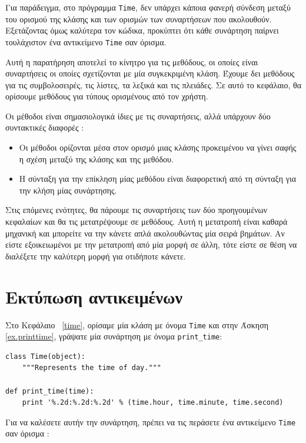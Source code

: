 \documentclass[10pt]{book}
\begin{document}
Για παράδειγμα, στο πρόγραμμα  {\tt Time},  δεν υπάρχει κάποια φανερή σύνδεση μεταξύ του ορισμού της κλάσης και των ορισμών των συναρτήσεων που ακολουθούν.  Εξετάζοντας όμως καλύτερα τον κώδικα, προκύπτει ότι κάθε συνάρτηση παίρνει τουλάχιστον ένα αντικείμενο  {\tt Time}  σαν όρισμα.

Αυτή η παρατήρηση αποτελεί το κίνητρο για τις μεθόδους, οι οποίες είναι συναρτήσεις οι οποίες σχετίζονται με μία συγκεκριμένη κλάση.  Έχουμε δει μεθόδους για τις συμβολοσειρές, τις λίστες, τα λεξικά και τις πλειάδες.  Σε αυτό το κεφάλαιο, θα ορίσουμε μεθόδους για τύπους ορισμένους από τον χρήστη.

Οι μέθοδοι είναι σημασιολογικά ίδιες με τις συναρτήσεις, αλλά υπάρχουν δύο συντακτικές διαφορές :

\begin{itemize}

\item Οι μέθοδοι ορίζονται μέσα στον ορισμό μιας κλάσης προκειμένου να γίνει σαφής η σχέση μεταξύ της κλάσης και της μεθόδου.

\item Η σύνταξη για την επίκληση μίας μεθόδου είναι διαφορετική από τη σύνταξη για την κλήση μίας συνάρτησης.

\end{itemize}

Στις επόμενες ενότητες, θα πάρουμε τις συναρτήσεις των δύο προηγουμένων κεφαλαίων και θα τις μετατρέψουμε σε μεθόδους.  Αυτή 
η μετατροπή είναι καθαρά μηχανική και μπορείτε να την κάνετε απλά ακολουθώντας μία σειρά βημάτων.  Αν είστε εξοικειωμένοι με την μετατροπή από μία μορφή σε άλλη, τότε είστε σε θέση να διαλέξετε την καλύτερη μορφή για οτιδήποτε κάνετε.


\section{Εκτύπωση αντικειμένων}

Στο Κεφάλαιο~ \ref{time},  ορίσαμε μία κλάση με όνομα  {\tt Time}  και στην Άσκηση~ \ref{ex.printtime},  γράψατε μία συνάρτηση με όνομα  \verb"print_time":

\begin{verbatim}
class Time(object):
    """Represents the time of day."""

def print_time(time):
    print '%.2d:%.2d:%.2d' % (time.hour, time.minute, time.second)
\end{verbatim}
%
 Για να καλέσετε αυτήν την συνάρτηση, πρέπει να τις περάσετε ένα αντικείμενο  {\tt Time}  σαν όρισμα :
\end{document}
